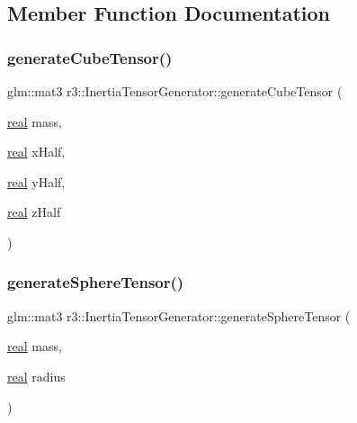 \subsection{Member Function Documentation}
\mbox{\label{classr3_1_1_inertia_tensor_generator_ae4d92045858bfe898a3bc6c779fe3d9b}} 
\subsubsection{\texorpdfstring{generate\+Cube\+Tensor()}{generateCubeTensor()}}
{\footnotesize\ttfamily glm\+::mat3 r3\+::\+Inertia\+Tensor\+Generator\+::generate\+Cube\+Tensor (\begin{DoxyParamCaption}\item[{\mbox{\hyperlink{namespacer3_ab2016b3e3f743fb735afce242f0dc1eb}{real}}}]{mass,  }\item[{\mbox{\hyperlink{namespacer3_ab2016b3e3f743fb735afce242f0dc1eb}{real}}}]{x\+Half,  }\item[{\mbox{\hyperlink{namespacer3_ab2016b3e3f743fb735afce242f0dc1eb}{real}}}]{y\+Half,  }\item[{\mbox{\hyperlink{namespacer3_ab2016b3e3f743fb735afce242f0dc1eb}{real}}}]{z\+Half }\end{DoxyParamCaption})\hspace{0.3cm}{\ttfamily [static]}}

\mbox{\label{classr3_1_1_inertia_tensor_generator_a637b526735235ca96cab6e7414f7a8c2}} 
\subsubsection{\texorpdfstring{generate\+Sphere\+Tensor()}{generateSphereTensor()}}
{\footnotesize\ttfamily glm\+::mat3 r3\+::\+Inertia\+Tensor\+Generator\+::generate\+Sphere\+Tensor (\begin{DoxyParamCaption}\item[{\mbox{\hyperlink{namespacer3_ab2016b3e3f743fb735afce242f0dc1eb}{real}}}]{mass,  }\item[{\mbox{\hyperlink{namespacer3_ab2016b3e3f743fb735afce242f0dc1eb}{real}}}]{radius }\end{DoxyParamCaption})\hspace{0.3cm}{\ttfamily [static]}}



